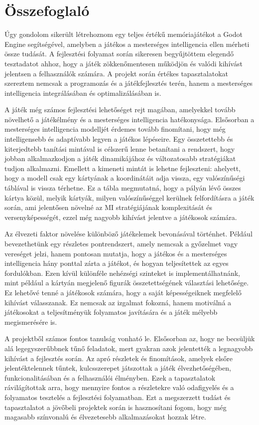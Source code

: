 \chapter{Összefoglaló}

\thispagestyle{fancy}
\pagestyle{fancy}
Úgy gondolom sikerült létrehoznom egy teljes értékű memóriajátékot a Godot Engine segítségével, amelyben a játékos a mesterséges intelligencia ellen mérheti össze tudását. 
A fejlesztési folyamat során sikeresen begyűjtöttem elegendő tesztadatot ahhoz, hogy a játék zökkenőmentesen működjön és valódi kihívást jelentsen a felhasználók számára. 
A projekt során értékes tapasztalatokat szereztem nemcsak a programozás és a játékfejlesztés terén, hanem a mesterséges intelligencia integrálásában és optimalizálásában is.

A játék még számos fejlesztési lehetőséget rejt magában, amelyekkel tovább növelhető a játékélmény és a mesterséges intelligencia hatékonysága. 
Elsősorban a mesterséges intelligencia modelljét érdemes tovább finomítani, hogy még intelligensebb és adaptívabb legyen a játékos lépéseire. 
Egy összetettebb és kiterjedtebb tanítási mintával is célszerű lenne betanítani a rendszert, hogy jobban alkalmazkodjon a játék dinamikájához és változatosabb stratégiákat tudjon alkalmazni. 
Emellett a kimeneti mintát is lehetne fejleszteni: ahelyett, hogy a modell csak egy kártyának a koordinátáit adja vissza, egy valószínűségi táblával is vissza térhetne.
Ez a tábla megmutatná, hogy a pályán lévő összes kártya közül, melyik kártyák, milyen valószínűséggel kerülnek felfordításra a játék során, ami jelentősen növelné az MI stratégiájának komplexitását és versenyképességét, ezzel még nagyobb kihívást jelentve a játékosok számára.

Az élvezeti faktor növelése különböző játékelemek bevonásával történhet. 
Például bevezethetünk egy részletes pontrendszert, amely nemcsak a győzelmet vagy vereséget jelzi, hanem pontosan mutatja, hogy a játékos és a mesterséges intelligencia hány ponttal zárta a játékot, és hogyan teljesítettek az egyes fordulókban. 
Ezen kívül különféle nehézségi szinteket is implementálhatnánk, mint például a  kártyán megjelenő figurák összetettségének választási lehetősége. Ez lehetővé tenné a játékosok számára, hogy a saját képességeiknek megfelelő kihívást válasszanak. 
Ez nemcsak az izgalmat fokozná, hanem motiválná a játékosokat a teljesítményük folyamatos javítására és a játék mélyebb megismerésére is.

A projektből számos fontos tanulság vonható le. Elsősorban az, hogy ne becsüljük alá legegyszerűbbnek tűnő feladatok, mert gyakran azok jelentették a legnagyobb kihívást a fejlesztés során. 
Az apró részletek és finomítások, amelyek elsőre jelentéktelennek tűntek, kulcsszerepet játszottak a játék élvezhetőségében, funkcionalitásában és a felhasználói élményben. 
Ezek a tapasztalatok rávilágítottak arra, hogy mennyire fontos a részletekre való odafigyelés és a folyamatos tesztelés a fejlesztési folyamatban.
Ezt a megszerzett tudást és tapasztalatot a jövőbeli projektek során is hasznosítani fogom, hogy még magasabb színvonalú és élvezetesebb alkalmazásokat hozzak létre.